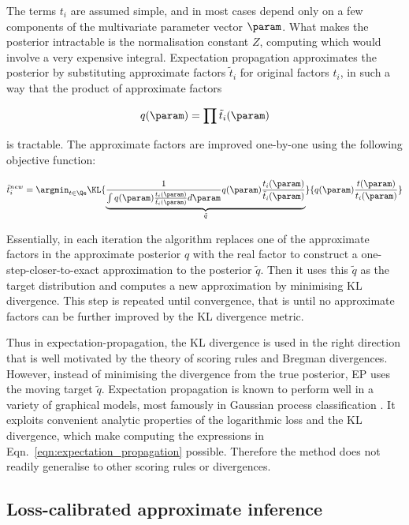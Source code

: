 The terms $t_i$ are assumed simple, and in most cases depend only on a few components of the multivariate parameter vector $\param$. What makes the posterior intractable is the normalisation constant $Z$, computing which would involve a very expensive integral. Expectation propagation approximates the posterior by substituting approximate factors $\tilde{t}_i$ for original factors $t_i$, in such a way that the product of approximate factors

\begin{equation}
	q(\param) = \prod \tilde{t}_i(\param)
\end{equation}

is tractable. The approximate factors are improved one-by-one using the following objective function:

\begin{equation}
	\tilde{t}_i^{new} = \argmin_{t \in \Qe} \KL{\underbrace{\frac{1}{\int q(\param)\frac{t_i(\param)}{\tilde{t}_i(\param)} d\param}q(\param)\frac{t_i(\param)}{\tilde{t}_i(\param)}}_{\tilde{q}}}{q(\param)\frac{t(\param)}{t_i(\param)}} \label{eqn:expectation_propagation}
\end{equation}

Essentially, in each iteration the algorithm replaces one of the approximate factors in the approximate posterior $q$ with the real factor to construct a one-step-closer-to-exact approximation to the posterior $\tilde{q}$. Then it uses this $\tilde{q}$ as the target distribution and computes a new approximation by minimising KL divergence. This step is repeated until convergence, that is until no approximate factors can be further improved by the KL divergence metric.

Thus in expectation-propagation, the KL divergence is used in the right direction that is well motivated by the theory of scoring rules and Bregman divergences. However, instead of minimising the divergence from the true posterior, EP uses the moving target $\tilde{q}$. Expectation propagation is known to perform well in a variety of graphical models, most famously in Gaussian process classification \citep{Nickisch2008}. It exploits convenient analytic properties of the logarithmic loss and the KL divergence, which make computing the expressions in Eqn.\ \eqref{eqn:expectation_propagation} possible. Therefore the method does not readily generalise to other scoring rules or divergences.

\subsection{Loss-calibrated approximate inference}

